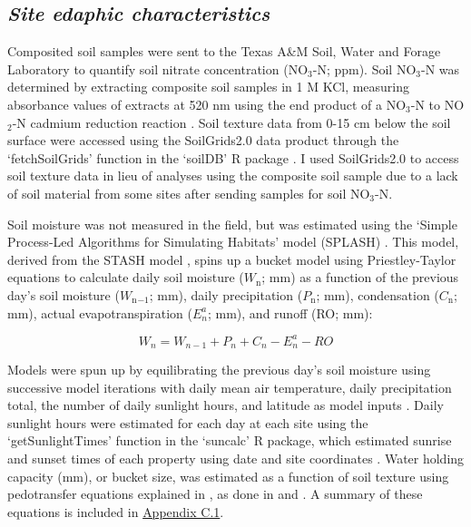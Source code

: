 \subsection{\textit{Site edaphic characteristics}}
\noindent Composited soil samples were sent to the Texas A\&M Soil, Water and Forage Laboratory to quantify soil nitrate concentration (NO$_3$-N; ppm). Soil NO$_3$-N was determined by extracting composite soil samples in 1 M KCl, measuring absorbance values of extracts at 520 nm using the end product of a NO$_3$-N to NO$_2$-N cadmium reduction reaction . Soil texture data from 0-15 cm below the soil surface were accessed using the SoilGrids2.0 data product  through the `fetchSoilGrids’ function in the ‘soilDB’ R package . I used SoilGrids2.0 to access soil texture data in lieu of analyses using the composite soil sample due to a lack of soil material from some sites after sending samples for soil NO$_3$-N.

Soil moisture was not measured in the field, but was estimated using the `Simple Process-Led Algorithms for Simulating Habitats’ model (SPLASH) . This model, derived from the STASH model , spins up a bucket model using Priestley-Taylor equations  to calculate daily soil moisture ($W_\mathrm{n}$; mm) as a function of the previous day’s soil moisture ($W_\mathrm{n}{}_{-1}$; mm), daily precipitation ($P_\mathrm{n}$; mm), condensation ($C_\mathrm{n}$; mm), actual evapotranspiration ($E_{n}^a$; mm), and runoff (RO; mm):

\begin{equation}
    \label{eq_4.7}
    W_n = W_{n-1} + P_n + C_n - E_{n}^{a} - RO
\end{equation}

\noindent Models were spun up by equilibrating the previous day's soil moisture using successive model iterations with daily mean air temperature, daily precipitation total, the number of daily sunlight hours, and latitude as model inputs . Daily sunlight hours were estimated for each day at each site using the `getSunlightTimes’ function in the `suncalc’ R package, which estimated sunrise and sunset times of each property using date and site coordinates . Water holding capacity (mm), or bucket size, was estimated as a function of soil texture using pedotransfer equations explained in , as done in  and . A summary of these equations is included in \hyperref[appendix.c1]{Appendix C.1}.

